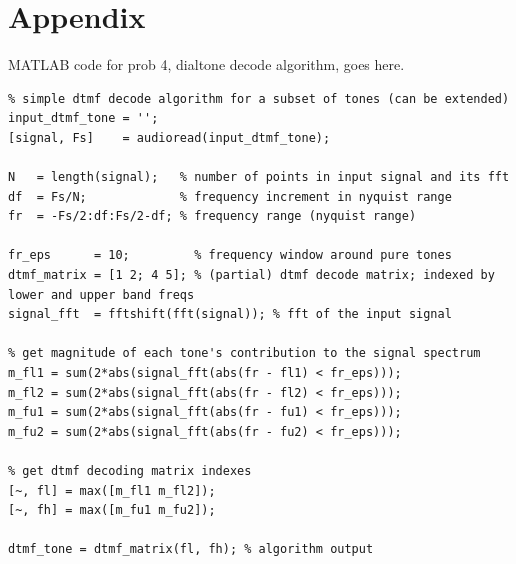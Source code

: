 \documentclass[10pt]{article}
\begin{document}
\newpage
\clearpage
\section*{Appendix}

MATLAB code for prob 4, dialtone decode algorithm, goes here.

\begin{lstlisting}
% simple dtmf decode algorithm for a subset of tones (can be extended)
input_dtmf_tone = '';
[signal, Fs]    = audioread(input_dtmf_tone);

N   = length(signal);   % number of points in input signal and its fft
df  = Fs/N;             % frequency increment in nyquist range
fr  = -Fs/2:df:Fs/2-df; % frequency range (nyquist range)

fr_eps      = 10;         % frequency window around pure tones
dtmf_matrix = [1 2; 4 5]; % (partial) dtmf decode matrix; indexed by lower and upper band freqs
signal_fft  = fftshift(fft(signal)); % fft of the input signal

% get magnitude of each tone's contribution to the signal spectrum
m_fl1 = sum(2*abs(signal_fft(abs(fr - fl1) < fr_eps)));
m_fl2 = sum(2*abs(signal_fft(abs(fr - fl2) < fr_eps)));
m_fu1 = sum(2*abs(signal_fft(abs(fr - fu1) < fr_eps)));
m_fu2 = sum(2*abs(signal_fft(abs(fr - fu2) < fr_eps)));

% get dtmf decoding matrix indexes
[~, fl] = max([m_fl1 m_fl2]);
[~, fh] = max([m_fu1 m_fu2]);

dtmf_tone = dtmf_matrix(fl, fh); % algorithm output
\end{lstlisting}
\end{document}
